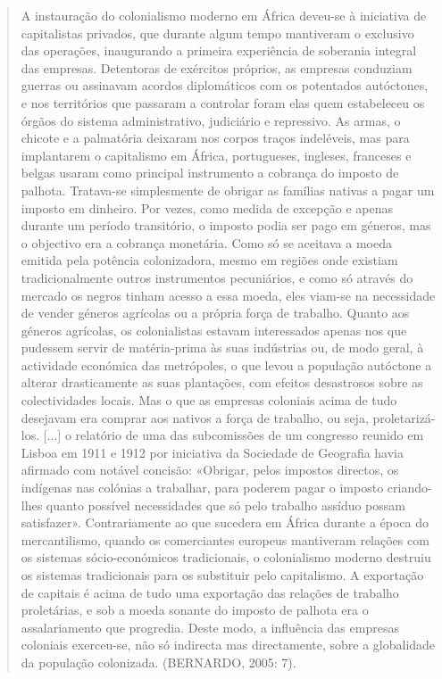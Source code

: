 \begin{quote}
A instauração do colonialismo moderno em África deveu-se à iniciativa de
capitalistas privados, que durante algum tempo mantiveram o exclusivo
das operações, inaugurando a primeira experiência de soberania integral
das empresas. Detentoras de exércitos próprios, as empresas conduziam
guerras ou assinavam acordos diplomáticos com os potentados autóctones,
e nos territórios que passaram a controlar foram elas quem estabeleceu
os órgãos do sistema administrativo, judiciário e repressivo. As armas,
o chicote e a palmatória deixaram nos corpos traços indeléveis, mas para
implantarem o capitalismo em África, portugueses, ingleses, franceses e
belgas usaram como principal instrumento a cobrança do imposto de
palhota. Tratava-se simplesmente de obrigar as famílias nativas a pagar
um imposto em dinheiro. Por vezes, como medida de excepção e apenas
durante um período transitório, o imposto podia ser pago em géneros, mas
o objectivo era a cobrança monetária. Como só se aceitava a moeda
emitida pela potência colonizadora, mesmo em regiões onde existiam
tradicionalmente outros instrumentos pecuniários, e como só através do
mercado os negros tinham acesso a essa moeda, eles viam-se na
necessidade de vender géneros agrícolas ou a própria força de trabalho.
Quanto aos géneros agrícolas, os colonialistas estavam interessados
apenas nos que pudessem servir de matéria-prima às suas indústrias ou,
de modo geral, à actividade económica das metrópoles, o que levou a
população autóctone a alterar drasticamente as suas plantações, com
efeitos desastrosos sobre as colectividades locais. Mas o que as
empresas coloniais acima de tudo desejavam era comprar aos nativos a
força de trabalho, ou seja, proletarizá-los. {[}...{]} o relatório de
uma das subcomissões de um congresso reunido em Lisboa em 1911 e 1912
por iniciativa da Sociedade de Geografia havia afirmado com notável
concisão: «Obrigar, pelos impostos directos, os indígenas nas colónias a
trabalhar, para poderem pagar o imposto criando-lhes quanto possível
necessidades que só pelo trabalho assíduo possam satisfazer».
Contrariamente ao que sucedera em África durante a época do
mercantilismo, quando os comerciantes europeus mantiveram relações com
os sistemas sócio-económicos tradicionais, o colonialismo moderno
destruiu os sistemas tradicionais para os substituir pelo capitalismo. A
exportação de capitais é acima de tudo uma exportação das relações de
trabalho proletárias, e sob a moeda sonante do imposto de palhota era o
assalariamento que progredia. Deste modo, a influência das empresas
coloniais exerceu-se, não só indirecta mas directamente, sobre a
globalidade da população colonizada. (BERNARDO, 2005: 7).
\end{quote}

